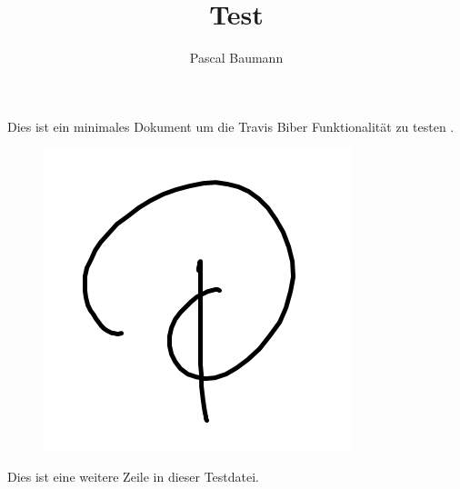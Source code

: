 \documentclass[a4paper]{scrreprt}
\title{Test}
\author{Pascal Baumann}
\begin{document}
\maketitle
\begin{abstract}
\end{abstract}

Dies ist ein minimales Dokument um die Travis Biber Funktionalität zu testen \parencite{Baumann2019}.

\begin{figure}[h!]
	\includegraphics{./Test.png}
\end{figure}

Dies ist eine weitere Zeile in dieser Testdatei.
\end{document}
